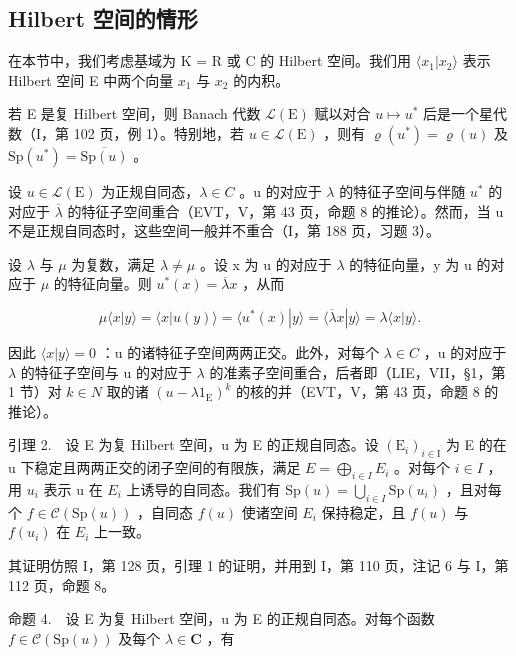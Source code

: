\subsection{Hilbert 空间的情形}

在本节中，我们考虑基域为 K = R 或 C 的 Hilbert 空间。我们用 \(\langle x_{1}|x_{2}\rangle\) 表示 Hilbert 空间 E 中两个向量 \(x_{1}\) 与 \(x_{2}\) 的内积。

若 E 是复 Hilbert 空间，则 Banach 代数 \(\mathcal{L}(\mathrm{E})\) 赋以对合 \(u\mapsto u^{*}\) 后是一个星代数（I，第 102 页，例 1）。特别地，若 \(u\in \mathcal{L}(\mathrm{E})\) ，则有 \(\varrho (u^{*}) = \varrho (u)\) 及 \(\mathrm{Sp}(u^{*}) = \overline{\mathrm{Sp}(u)}\) 。

设 \(u \in \mathcal{L}(\mathrm{E})\) 为正规自同态，\(\lambda \in C\) 。u 的对应于 \(\lambda\) 的特征子空间与伴随 \(u^{*}\) 的对应于 \(\overline{\lambda}\) 的特征子空间重合（EVT，V，第 43 页，命题 8 的推论）。然而，当 u 不是正规自同态时，这些空间一般并不重合（I，第 188 页，习题 3）。

设 \(\lambda\) 与 \(\mu\) 为复数，满足 \(\lambda \neq \mu\) 。设 x 为 u 的对应于 \(\lambda\) 的特征向量，y 为 u 的对应于 \(\mu\) 的特征向量。则 \(u^{*}(x) = \overline{\lambda}x\) ，从而

\[
\mu \langle x | y \rangle = \langle x | u (y) \rangle = \langle u ^ {*} (x) | y \rangle = \langle \overline {{\lambda}} x | y \rangle = \lambda \langle x | y \rangle .
\]

因此 \(\langle x|y\rangle = 0\) ：u 的诸特征子空间两两正交。此外，对每个 \(\lambda \in C\) ，u 的对应于 \(\lambda\) 的特征子空间与 u 的对应于 \(\lambda\) 的准素子空间重合，后者即（LIE，VII，§1，第 1 节）对 \(k \in N\) 取的诸 \((u - \lambda1_{\mathrm{E}})^{k}\) 的核的并（EVT，V，第 43 页，命题 8 的推论）。

引理 2.　设 E 为复 Hilbert 空间，u 为 E 的正规自同态。设 \((\mathrm{E}_{i})_{i\in\mathrm{I}}\) 为 E 的在 u 下稳定且两两正交的闭子空间的有限族，满足 \(E=\bigoplus_{i\in I}E_{i}\) 。对每个 \(i\in I\) ，用 \(u_{i}\) 表示 u 在 \(E_{i}\) 上诱导的自同态。我们有 \(\mathrm{Sp}(u)=\bigcup_{i\in I}\mathrm{Sp}(u_{i})\) ，且对每个 \(f\in\mathcal{C}(\mathrm{Sp}(u))\) ，自同态 \(f(u)\) 使诸空间 \(E_{i}\) 保持稳定，且 \(f(u)\) 与 \(f(u_{i})\) 在 \(E_{i}\) 上一致。

其证明仿照 I，第 128 页，引理 1 的证明，并用到 I，第 110 页，注记 6 与 I，第 112 页，命题 8。

命题 4.　设 E 为复 Hilbert 空间，u 为 E 的正规自同态。对每个函数 \(f \in \mathcal{C}(\mathrm{Sp}(u))\) 及每个 \(\lambda \in \mathbf{C}\) ，有

